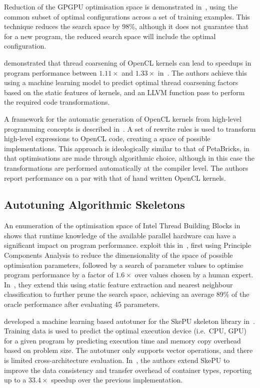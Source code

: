 \documentclass[nonatbib,preprint,10pt]{sigplanconf}
\begin{document}
Reduction of the GPGPU optimisation space is demonstrated
in~\cite{Ryoo2008}, using the common subset of optimal configurations
across a set of training examples. This technique reduces the search
space by 98\%, although it does not guarantee that for a new program,
the reduced search space will include the optimal configuration.

\citeauthor{Magni2014} demonstrated that thread coarsening of OpenCL
kernels can lead to speedups in program performance between
$1.11\times$ and $1.33\times$ in~\cite{Magni2014}. The authors achieve
this using a machine learning model to predict optimal thread
coarsening factors based on the static features of kernels, and an
LLVM function pass to perform the required code transformations.

A framework for the automatic generation of OpenCL kernels from
high-level programming concepts is described in~\cite{Steuwer2015}. A
set of rewrite rules is used to transform high-level expressions to
OpenCL code, creating a space of possible implementations. This
approach is ideologically similar to that of PetaBricks, in that
optimisations are made through algorithmic choice, although in this
case the transformations are performed automatically at the compiler
level. The authors report performance on a par with that of hand
written OpenCL kernels.


\subsection{Autotuning Algorithmic Skeletons}

An enumeration of the optimisation space of Intel Thread Building
Blocks in~\cite{Contreras2008} shows that runtime knowledge of the
available parallel hardware can have a significant impact on program
performance. \citeauthor{Collins2012} exploit this
in~\cite{Collins2012}, first using Principle Components Analysis to
reduce the dimensionality of the space of possible optimisation
parameters, followed by a search of parameter values to optimise
program performance by a factor of $1.6\times$ over values chosen by a
human expert. In~\cite{Collins2013}, they extend this using static
feature extraction and nearest neighbour classification to further
prune the search space, achieving an average 89\% of the oracle
performance after evaluating 45 parameters.

\citeauthor{Dastgeer2011} developed a machine learning based autotuner
for the SkePU skeleton library in~\cite{Dastgeer2011}. Training data
is used to predict the optimal execution device (i.e.\ CPU, GPU) for a
given program by predicting execution time and memory copy overhead
based on problem size. The autotuner only supports vector operations,
and there is limited cross-architecture
evaluation. In~\cite{Dastgeer2015a}, the authors extend SkePU to
improve the data consistency and transfer overhead of container types,
reporting up to a $33.4\times$ speedup over the previous
implementation.
\end{document}
